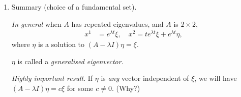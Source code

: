 \documentclass[11pt, letterpaper, oneside]{article}     %
\numberwithin{equation}{subsection}
\theoremstyle{definition}
\numberwithin{theorem}{section}
\theoremstyle{remark}
\begin{document}
\begin{enumerate}[itemsep=10pt]
  Then $\dot x - Ax = 0$ gives
  \begin{align}
    0 = e^{\lambda t}\xi + (\lambda e^{\lambda t}\eta - Ae^{\lambda t}\eta),
  \end{align}
  and therefore
  \begin{align}
    e^{\lambda t}(\xi + \lambda\eta - A\eta) = 0
    &\implies \xi + \lambda\eta - A\eta = 0\\
    &\implies \xi = (A - \lambda I)\eta.
  \end{align}
  Notice that $A - \lambda I$ is not invertible. But concretely we want to solve
  \begin{align}
    \begin{bmatrix}
      -2 & -1\\
      4 & 2
    \end{bmatrix}
    \begin{bmatrix}
      \eta_1 \\ \eta_2
    \end{bmatrix}
    =
    \begin{bmatrix}
      1 \\ -2
    \end{bmatrix}.
  \end{align}
  Is $\xi$ always in the column space of $A - \lambda I$?

\item Summary (choice of a fundamental set).

  \emph{In general} when $A$ has repeated eigenvalues, and $A$ is $2\times 2$,
  \begin{align}
    x^1 &= e^{\lambda t}\xi,\quad
    x^2 = te^{\lambda t}\xi + e^{\lambda t}\eta,
  \end{align}
  where $\eta$ is a solution to $(A-\lambda I)\eta = \xi$.

  $\eta$ is called a \emph{generalised eigenvector}.

  \emph{Highly important result}. If $\eta$ is \emph{any} vector independent of $\xi$, we will have $(A - \lambda I)\eta = c\xi$ for some $c \neq 0$. (Why?)

  \end{enumerate}
\end{document}
